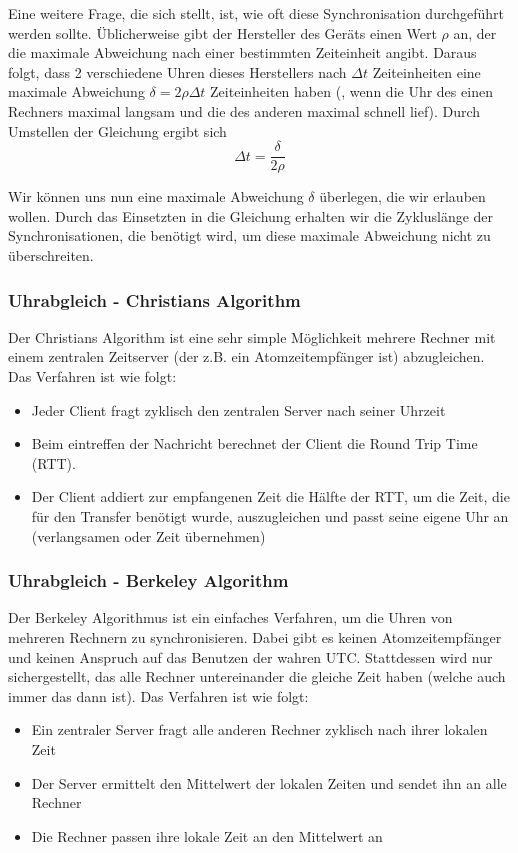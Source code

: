 Eine weitere Frage, die sich stellt, ist, wie oft diese Synchronisation durchgeführt werden sollte. Üblicherweise gibt der Hersteller des Geräts einen Wert $\rho$ an, der die maximale Abweichung nach einer bestimmten Zeiteinheit angibt. Daraus folgt, dass 2 verschiedene Uhren dieses Herstellers nach $\Delta t$ Zeiteinheiten eine maximale Abweichung $\delta = 2 \rho \Delta t$ Zeiteinheiten haben (, wenn die Uhr des einen Rechners maximal langsam und die des anderen maximal schnell lief). Durch Umstellen der Gleichung ergibt sich
\[ \Delta  t = \frac{\delta}{2 \rho}\]

Wir können uns nun eine maximale Abweichung $\delta$ überlegen, die wir erlauben wollen. Durch das Einsetzten in die Gleichung erhalten wir die Zykluslänge der Synchronisationen, die benötigt wird, um diese maximale Abweichung nicht zu überschreiten.

\subsubsection{Uhrabgleich - Christian\textquotesingle s Algorithm}

Der Christian\textquotesingle s Algorithm ist eine sehr simple Möglichkeit mehrere Rechner mit einem zentralen Zeitserver (der z.B. ein Atomzeitempfänger ist) abzugleichen. Das Verfahren ist wie folgt:
\begin{itemize}
    \item Jeder Client fragt zyklisch den zentralen Server nach seiner Uhrzeit
    \item Beim eintreffen der Nachricht berechnet der Client die Round Trip Time (RTT).
    \item Der Client addiert zur empfangenen Zeit die Hälfte der  RTT, um die Zeit, die für den Transfer benötigt wurde, auszugleichen und passt seine eigene Uhr an (verlangsamen oder Zeit übernehmen)
\end{itemize}

\subsubsection{Uhrabgleich - Berkeley Algorithm}

Der Berkeley Algorithmus ist ein einfaches Verfahren, um die Uhren von mehreren Rechnern zu synchronisieren. Dabei gibt es keinen Atomzeitempfänger und keinen Anspruch auf das Benutzen der wahren UTC. Stattdessen wird nur sichergestellt, das alle Rechner untereinander die gleiche Zeit haben (welche auch immer das dann ist). Das Verfahren ist wie folgt:
\begin{itemize}
    \item Ein zentraler Server fragt alle anderen Rechner zyklisch nach ihrer lokalen Zeit
    \item Der Server ermittelt den Mittelwert der lokalen Zeiten und sendet ihn an alle Rechner
    \item Die Rechner passen ihre lokale Zeit an den Mittelwert an
\end{itemize}

